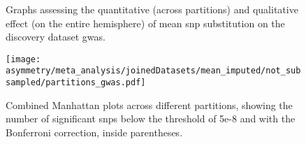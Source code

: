 \begin{figure}[H]
\begin{adjustwidth}{-3 cm}{-2.5 cm}
\begin{minipage}{0.45\linewidth}
{				
			}
			\par\medskip
			\centering
		\end{minipage}
	\end{adjustwidth}
	\caption[Effect of \acs{snp} mean substitution on results]{Graphs assessing the quantitative (across partitions) and qualitative effect (on the entire hemisphere) of mean \acs{snp} substitution on the discovery dataset \acs{gwas}.}
\end{figure}

\begin{figure}[H]
	\begin{adjustwidth}{-5.5 cm}{-5 cm}\centering	
	\texttt{[image: asymmetry/meta\_analysis/joinedDatasets/mean\_imputed/not\_subsampled/partitions\_gwas.pdf]}
	\end{adjustwidth}
	\caption[Combined Manhattan plots across different partitions]{Combined Manhattan plots across different partitions, showing the number of significant \acp{snp} below the threshold of 5e-8 and with the Bonferroni correction, inside parentheses.}
	\label{fig:part_manhattan}
\end{figure}

